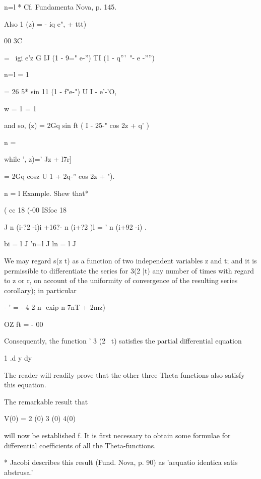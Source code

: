n=l * Cf. Fundamenta Nova, p. 145.

%
%

Also 1 (z) = - iq e", + ttt)

00 3C

= \ igi e'z G IJ (1 - 9=" e-'') TI (1 - q'''~"- e -'''')

n=l = 1

= 26 5* sin 11 (1 - f"e-") U I - e'-'O,

w = 1 = 1

and so, (z) = 2Gq sin ft ( I - 25-" cos 2z + q' )

n = \

while ', z)=' Jz + l7r]

= 2Gq cosz U 1 + 2q-'' cos 2z + ").

n = l Example. Shew that*

( cc 18 (-00 ISfoc 18

J n (i-?2 -i)i +16?- n (i+?2 )l = ' n (i+92 -i) .

bi = l J 'n=l J ln = l J



We may regard s(z t) as a function of two independent variables z and
t; and it is permissible to differentiate the series for 3(2 |t) any
number of times with regard to z or r, on account of the uniformity of
convergence of the resulting series  corollary); in particular

- ' = - 4 2 n- exip n-7nT + 2mz)

OZ ft = - 00

Consequently, the function ' 3 (2 \ t) satisfies the partial
differential equation

1 .d y dy

The reader will readily prove that the other three Theta-functions
also satisfy this equation.


The remarkable result that

V(0) = 2 (0) 3 (0) 4(0)

will now be established f. It is first necessary to obtain some
formulae for differential coefficients of all the Theta-functions.

* Jacobi describes this result (Fund. Nova, p. 90) as 'aequatio
identica satis abstrusa.'

